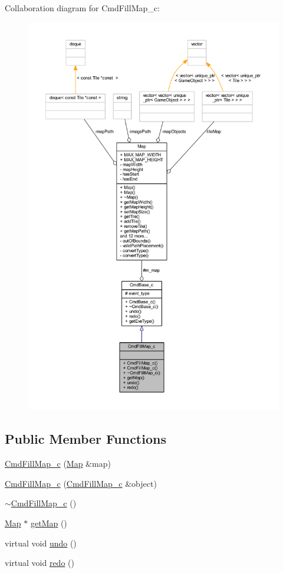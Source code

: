 Collaboration diagram for Cmd\+Fill\+Map\+\_\+c\+:
\nopagebreak
\begin{figure}[H]
\begin{center}
\leavevmode
\includegraphics[width=350pt]{class_cmd_fill_map__c__coll__graph}
\end{center}
\end{figure}
\subsection*{Public Member Functions}
\begin{DoxyCompactItemize}
\item 
\hyperlink{class_cmd_fill_map__c_af550a837d8dfeaa132f0142989601417}{Cmd\+Fill\+Map\+\_\+c} (\hyperlink{class_map}{Map} \&map)
\item 
\hyperlink{class_cmd_fill_map__c_ad23584b826ccbcf93b19a0b50e0b3d62}{Cmd\+Fill\+Map\+\_\+c} (\hyperlink{class_cmd_fill_map__c}{Cmd\+Fill\+Map\+\_\+c} \&object)
\item 
\hyperlink{class_cmd_fill_map__c_ae47760580663dd9da93f38a357452bc9}{$\sim$\+Cmd\+Fill\+Map\+\_\+c} ()
\item 
\hyperlink{class_map}{Map} $\ast$ \hyperlink{class_cmd_fill_map__c_a6b6db21bb875d71bb5c28f3b7ea9a76f}{get\+Map} ()
\item 
virtual void \hyperlink{class_cmd_fill_map__c_a1fc1349fea407dbc4a41f614eec45fbf}{undo} ()
\item 
virtual void \hyperlink{class_cmd_fill_map__c_a03c8b3d6027ae4bf50714b6358125eab}{redo} ()
\end{DoxyCompactItemize}
